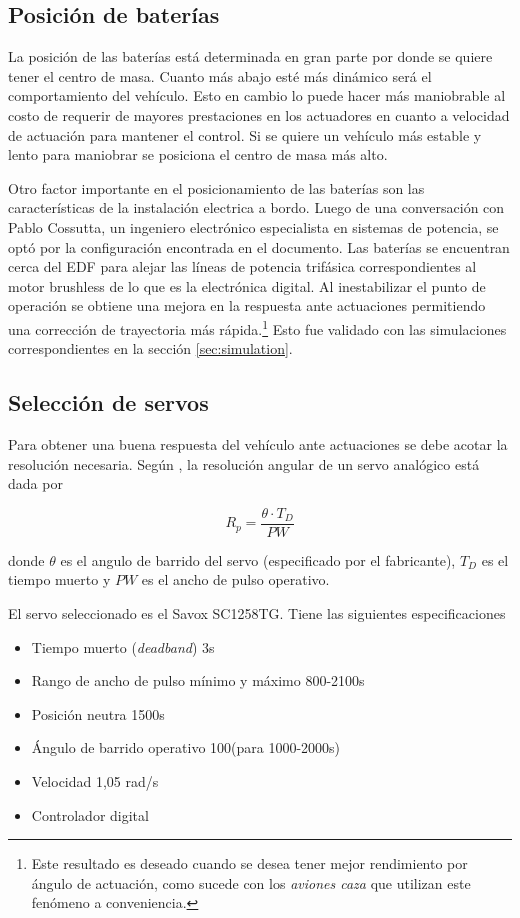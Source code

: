 \subsection{Posición de baterías}
La posición de las baterías está determinada en gran parte por donde se quiere 
tener el centro de masa. Cuanto más abajo esté más dinámico será el comportamiento
del vehículo. Esto en cambio lo puede hacer más maniobrable al costo de requerir de
mayores prestaciones en los actuadores en cuanto a velocidad de actuación para mantener el control. Si se quiere un vehículo más estable y lento para maniobrar se posiciona el centro de masa más alto.

Otro factor importante en el posicionamiento de las baterías son las características
de la instalación electrica a bordo. Luego de una conversación con Pablo Cossutta, un ingeniero electrónico especialista en sistemas de potencia, se optó por la configuración encontrada en el documento. Las baterías se encuentran cerca del EDF para alejar las líneas de potencia trifásica correspondientes al motor brushless de lo que es la electrónica digital. Al inestabilizar el punto de operación se obtiene una mejora en la respuesta ante actuaciones permitiendo una corrección de trayectoria más rápida.\footnote{Este resultado es deseado cuando se desea tener mejor rendimiento por ángulo de actuación, como sucede con los \textit{aviones caza} que utilizan este fenómeno a conveniencia.} Esto fue validado con las simulaciones correspondientes en la sección \ref{sec:simulation}.





\subsection{Selección de servos} \label{ssec:servoSeleccion}

Para obtener una buena respuesta del vehículo ante actuaciones se debe acotar la resolución necesaria. Según \cite{castillo2018efectos}, la resolución angular de un servo analógico está dada por


\[
R_p = \frac{\theta \cdot T_D}{PW}  
\]

donde $\theta$ es el angulo de barrido del servo (especificado por el fabricante), $T_D$ es el tiempo muerto y $PW$ es el ancho de pulso operativo. 

El servo seleccionado es el Savox SC1258TG. Tiene las siguientes especificaciones

\begin{itemize}
    \item Tiempo muerto (\textit{deadband}) 3\micro s
    \item Rango de ancho de pulso mínimo y máximo 800-2100\micro s
    \item Posición neutra 1500\micro s
    \item Ángulo de barrido operativo 100\grad (para 1000-2000\micro s)
    \item Velocidad 1,05 rad/s
    \item Controlador digital
\end{itemize}

